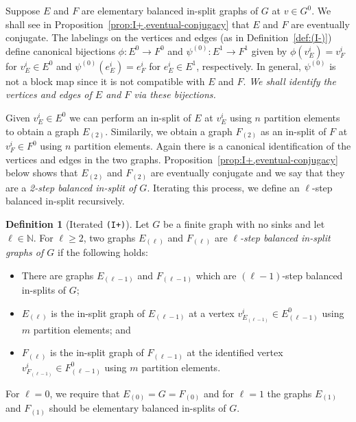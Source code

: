 \documentclass[12pt,a4paper,oneside,reqno,final]{amsart}
\newcommand{\LRA}{\longrightarrow}
\newcommand{\N}{\mathbb{N}}
\let\geq\geqslant{}
\theoremstyle{definition}
\newtheorem{definition}[lemma]{Definition}
\numberwithin{equation}{section} %
\begin{document}
Suppose $E$ and $F$ are elementary balanced in-split graphs of $G$ at $v\in G^0$.
We shall see in Proposition~\ref{prop:I+,eventual-conjugacy} that $E$ and $F$ are eventually conjugate.
The labelings on the vertices and edges (as in Definition~\ref{def:(I-)}) define canonical bijections $\phi\colon E^0 \LRA F^0$ and $\psi^{(0)}\colon E^1 \LRA F^1$ 
given by $\phi(v_E^i) = v_F^i$ for $v_E^i\in E^0$ and $\psi^{(0)}(e^i_E) = e^i_F$ for $e_E^i\in E^1$, respectively.
In general, $\psi^{(0)}$ is not a block map since it is not compatible with $E$ and $F$.
\emph{We shall identify the vertices and edges of $E$ and $F$ via these bijections.}

Given $v^i_E\in E^0$ we can perform an in-split of $E$ at $v^i_E$ using $n$ partition elements to obtain a graph $E_{(2)}$.
Similarily, we obtain a graph $F_{(2)}$ as an in-split of $F$ at $v^i_F\in F^0$ using $n$ partition elements.
Again there is a canonical identification of the vertices and edges in the two graphs.
Proposition~\ref{prop:I+,eventual-conjugacy} below shows that $E_{(2)}$ and $F_{(2)}$ are eventually conjugate
and we say that they are a \emph{2-step balanced in-split of $G$}.
Iterating this process, we define an $\ell$-step balanced in-split recursively.

\begin{definition}[Iterated \texttt{(I+)}]
    Let $G$ be a finite graph with no sinks and let $\ell\in \N$.
    For $\ell\geq 2$, two graphs $E_{(\ell)}$ and $F_{(\ell)}$ are \emph{$\ell$-step balanced in-split graphs of $G$} if the following holds:
    \begin{itemize}
        \item There are graphs $E_{(\ell - 1)}$ and $F_{(\ell - 1)}$ which are $(\ell - 1)$-step balanced in-splits of $G$;
        \item $E_{(\ell)}$ is the in-split graph of $E_{(\ell - 1)}$ at a vertex $v^i_{E_{(\ell - 1)}}\in E_{(\ell - 1)}^0$ using $m$ partition elements; and
        \item $F_{(\ell)}$ is the in-split graph of $F_{(\ell - 1)}$ at the identified vertex $v^i_{F_{(\ell - 1)}}\in F_{(\ell - 1)}^0$ using $m$ partition elements.
    \end{itemize}
    For $\ell = 0$, we require that $E_{(0)} = G = F_{(0)}$ and 
    for $\ell = 1$ the graphs $E_{(1)}$ and $F_{(1)}$ should be elementary balanced in-splits of $G$.
\end{definition}
\end{document}
